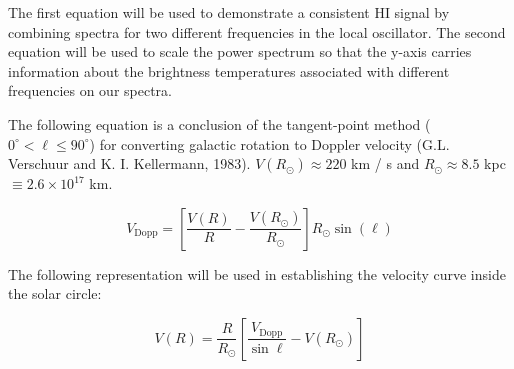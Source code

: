 \documentclass[12pt]{article}
\begin{document}
The first equation will be used to demonstrate a consistent HI signal by combining spectra for two different frequencies in the local oscillator. The second equation will be used to scale the power spectrum so that the y-axis carries information about the brightness temperatures associated with different frequencies on our spectra.

The following equation is a conclusion of the tangent-point method ($0^\circ < \ell \leq 90^\circ$) for converting galactic rotation to Doppler velocity (G.L. Verschuur and K. I. Kellermann, 1983). $V(R_\odot) \approx 220 $ km / s and $R_\odot \approx 8.5$ kpc $\equiv 2.6 \times 10^{17}$ km. 

\begin{equation} \label{eq:vel_dopp}
V_\text{Dopp} = \left[ \frac{V(R)}{R} - \frac{V(R_\odot)}{R_\odot} \right] R_\odot \sin(\ell)
\end{equation}



The following representation will be used in establishing the velocity curve inside the solar circle:

\begin{equation} \label{eq:vel_curve}
V(R) = \frac{R}{R_\odot} \left[ \frac{V_\text{Dopp}}{\sin \ell} - V(R_\odot) \right] 
\end{equation}




\end{document}
